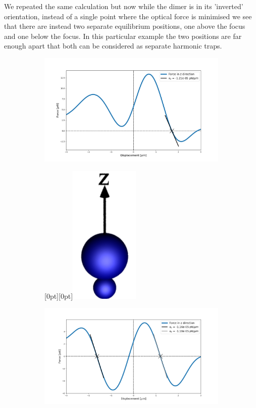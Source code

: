 We repeated the same calculation but now while the dimer is in its 'inverted' 
orientation, instead of a single point where the optical force is minimised we 
see that there are instead two separate equilibrium positions, one above the focus
and one below the focus. In this particular example the two positions are far enough
apart that both can be considered as separate harmonic traps.    
\begin{figure}[h!]
	\centering
	\begin{subfigure}{.65\linewidth}
		\includegraphics[width=\linewidth]{lam=2_theta=0.png}
		\caption{}
		\label{lam=2}
	\end{subfigure}\hfill %
	\begin{subfigure}{.25\linewidth}
		\centering
		\raisebox{0pt}[0pt][0pt]{\makebox{}\includegraphics[width=0.3\linewidth, keepaspectratio]{theta=0.png}}
		\label{large over small}
	\end{subfigure}
	\medskip
	\begin{subfigure}{.65\linewidth}
		\includegraphics[width=\linewidth]{lam=2_theta=180.png}

\end{subfigure}
\end{figure}
